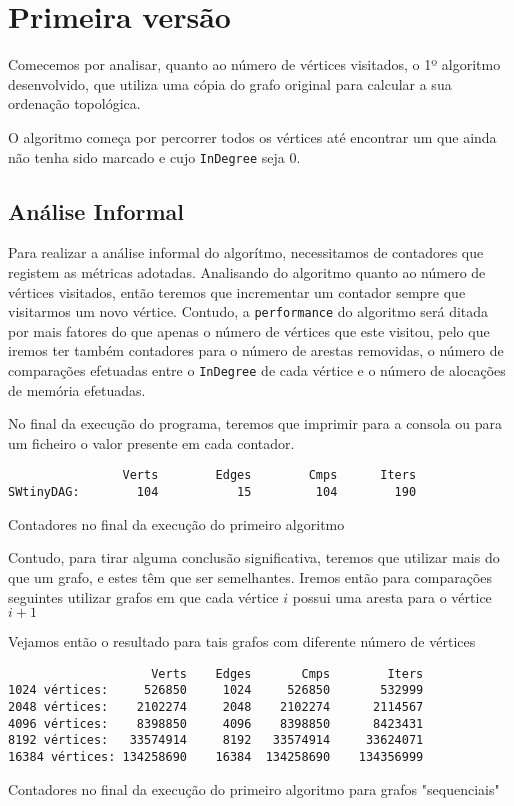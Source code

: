 \chapter{Primeira versão}
Comecemos por analisar, quanto ao número de vértices visitados, o 1º algoritmo desenvolvido, que utiliza
uma cópia do grafo original para calcular a sua ordenação
topológica.

O algoritmo começa por percorrer todos os vértices até encontrar
um que ainda não tenha sido marcado e cujo \verb|InDegree| seja
0.


\section{Análise Informal}

Para realizar a análise informal do algorítmo, necessitamos de
contadores que registem as métricas adotadas. Analisando do
algoritmo quanto ao número de vértices visitados, então teremos
que incrementar um contador sempre que visitarmos um novo
vértice. Contudo, a \verb|performance| do algoritmo será ditada
por mais fatores do que apenas o número de vértices que este
visitou, pelo que iremos ter também contadores para o número de
arestas removidas, o número de comparações efetuadas entre o
\verb|InDegree| de cada vértice e o número de alocações de
memória efetuadas.

No final da execução do programa, teremos que imprimir para a
consola ou para um ficheiro o valor presente em cada contador.

\begin{listing}[H]
	\centering
	\begin{verbatim}
                Verts	     Edges	      Cmps      Iters
SWtinyDAG:        104	        15	       104        190
  \end{verbatim}
	\caption{Contadores no final da execução do primeiro algoritmo}
\end{listing}

Contudo, para tirar alguma conclusão significativa, teremos que
utilizar mais do que um grafo, e estes têm que ser semelhantes.
Iremos então para comparações seguintes utilizar grafos em que
cada vértice $i$ possui uma aresta para o vértice $i+1$


Vejamos então o resultado para tais grafos com diferente número
de vértices

\begin{listing}[H]
	\centering
	\begin{verbatim}
                    Verts	 Edges	     Cmps        Iters
1024 vértices:     526850	  1024	   526850       532999
2048 vértices:    2102274	  2048	  2102274      2114567
4096 vértices:    8398850	  4096	  8398850      8423431
8192 vértices:   33574914	  8192	 33574914     33624071
16384 vértices: 134258690	 16384	134258690    134356999
  \end{verbatim}
	\caption{Contadores no final da execução do primeiro algoritmo
		para grafos "sequenciais"}
  \label{1-2}
\end{listing}

